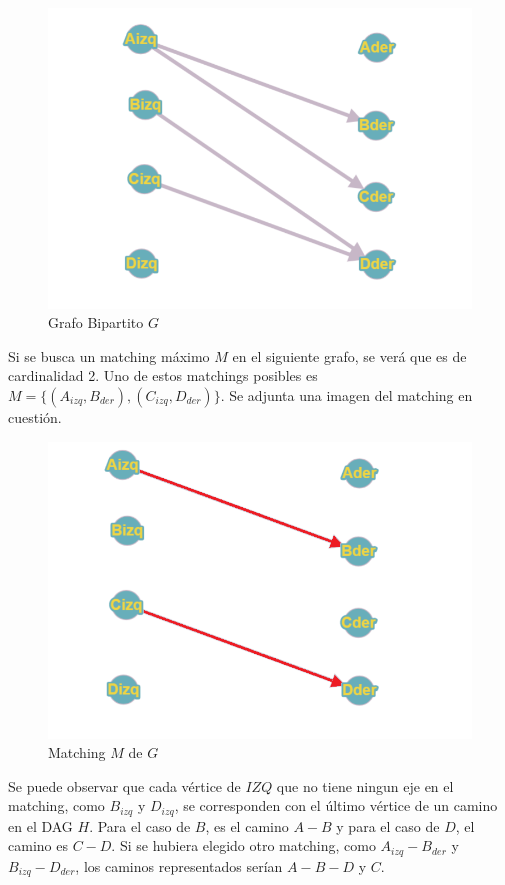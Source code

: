 \begin{figure}[H]
\centering
\includegraphics[width=15cm]{Imagenes/Ej2b.png}
\caption{Grafo Bipartito $G$}
\end{figure}

Si se busca un matching máximo $M$ en el siguiente grafo, se verá que es de cardinalidad 2. Uno de estos matchings posibles es $M = \{(A_{izq}, B_{der}),(C_{izq}, D_{der})\}$. Se adjunta una imagen del matching en cuestión. 

\begin{figure}[H]
\centering
\includegraphics[width=15cm]{Imagenes/Ej2c.png}
\caption{Matching $M$ de $G$}
\end{figure}

Se puede observar que cada vértice de $IZQ$ que no tiene ningun eje en el matching, como $B_{izq}$ y $D_{izq}$, se corresponden con el último vértice de un camino en el DAG $H$. Para el caso de $B$, es el camino $A-B$ y para el caso de $D$, el camino es $C-D$. Si se hubiera elegido otro matching, como $A_{izq} - B_{der}$ y $B_{izq} - D_{der}$, los caminos representados serían $A-B-D$ y $C$.

